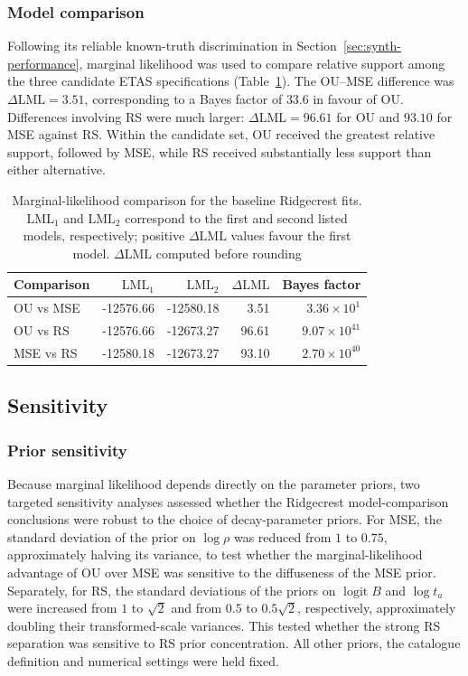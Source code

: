 \documentclass{statsmsc}
\begin{document}
\subsubsection{Model comparison}

Following its reliable known-truth discrimination in Section~\ref{sec:synth-performance}, marginal likelihood was used to compare relative support among the three candidate ETAS specifications (Table~\ref{tab:ridgecrest-model-comparison}). The OU--MSE difference was $\Delta\mathrm{LML} = 3.51$, corresponding to a Bayes factor of $33.6$ in favour of OU. Differences involving RS were much larger: $\Delta\mathrm{LML} = 96.61$ for OU and $93.10$ for MSE against RS. Within the candidate set, OU received the greatest relative support, followed by MSE, while RS received substantially less support than either alternative.
\begin{table}[htbp]
\centering
\caption{Marginal-likelihood comparison for the baseline Ridgecrest fits. $\mathrm{LML}_1$ and $\mathrm{LML}_2$ correspond to the first and second listed models, respectively; positive $\Delta\mathrm{LML}$ values favour the first model. $\Delta \mathrm{LML}$ computed before rounding}
\label{tab:ridgecrest-model-comparison}
\small
\begin{tabular}{lrrrr}
\hline
Comparison & $\mathrm{LML}_1$ & $\mathrm{LML}_2$ & $\Delta\mathrm{LML}$ & Bayes factor \\
\hline
OU vs MSE & -12576.66 & -12580.18 & 3.51  & $3.36\times10^{1}$ \\
OU vs RS  & -12576.66 & -12673.27 & 96.61 & $9.07\times10^{41}$ \\
MSE vs RS & -12580.18 & -12673.27 & 93.10 & $2.70\times10^{40}$ \\
\hline
\end{tabular}
\end{table}


\subsection{Sensitivity} \label{sec:sensitivity}


\subsubsection{Prior sensitivity} \label{sec:prior-sensitivity}
Because marginal likelihood depends directly on the parameter priors, two targeted sensitivity analyses assessed whether the Ridgecrest model-comparison conclusions were robust to the choice of decay-parameter priors. For MSE, the standard deviation of the prior on $\log\rho$ was reduced from $1$ to $0.75$, approximately halving its variance, to test whether the marginal-likelihood advantage of OU over MSE was sensitive to the diffuseness of the MSE prior. Separately, for RS, the standard deviations of the priors on $\operatorname{logit} B$ and $\log t_a$ were increased from $1$ to $\sqrt{2}$ and from $0.5$ to $0.5 \sqrt{2}$, respectively, approximately doubling their transformed-scale variances. This tested whether the strong RS separation was sensitive to RS prior concentration. All other priors, the catalogue definition and numerical settings were held fixed.
\end{document}
